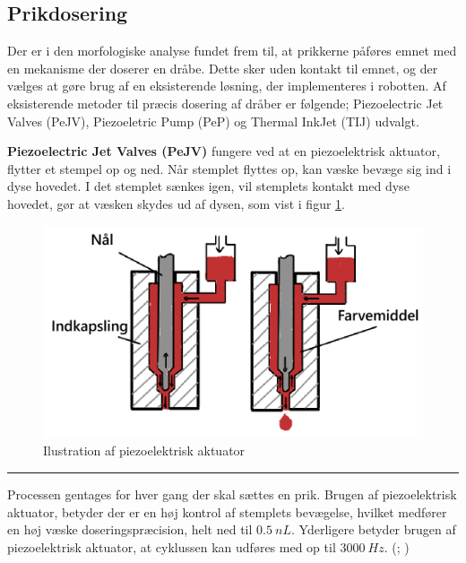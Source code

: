 \subsection{Prikdosering} \label{Prikplacering}
Der er i den morfologiske analyse fundet frem til, at prikkerne påføres emnet med en mekanisme der doserer en dråbe. Dette sker uden kontakt til emnet, og der vælges at gøre brug af en eksisterende løsning, der implementeres i robotten. Af eksisterende metoder til præcis dosering af dråber er følgende; Piezoelectric Jet Valves (PeJV), Piezoeletric Pump (PeP) og Thermal InkJet (TIJ) udvalgt. 




\textbf{Piezoelectric Jet Valves (PeJV)} fungere ved at en piezoelektrisk aktuator, flytter et stempel op og ned. Når stemplet flyttes op, kan væske bevæge sig ind i dyse hovedet. I det stemplet sænkes igen, vil stemplets kontakt med dyse hovedet, gør at væsken skydes ud af dysen, som vist i figur \ref{fig:PeJV}.

\begin{figure}[H]
    \centering
    \includegraphics[width=0.6\linewidth]{Sections/5 Konceptgenerering/Media/PEJV.png}
    \caption{Ilustration af piezoelektrisk aktuator}
    \label{fig:PeJV}
\end{figure} \plainbreak{-.5}

 Processen gentages for hver gang der skal sættes en prik. Brugen af piezoelektrisk aktuator, betyder der er en høj kontrol af stemplets bevægelse, hvilket medfører en høj væske doseringspræcision, helt ned til \(\SI{0,5}{nL}\). Yderligere betyder brugen af piezoelektrisk aktuator, at cyklussen kan udføres med op til \(\SI{3000}{Hz}\). (\cite{VIEWEG2025JetDV-6210}; \cite{Hoath2016FundamentalsDroplets})


